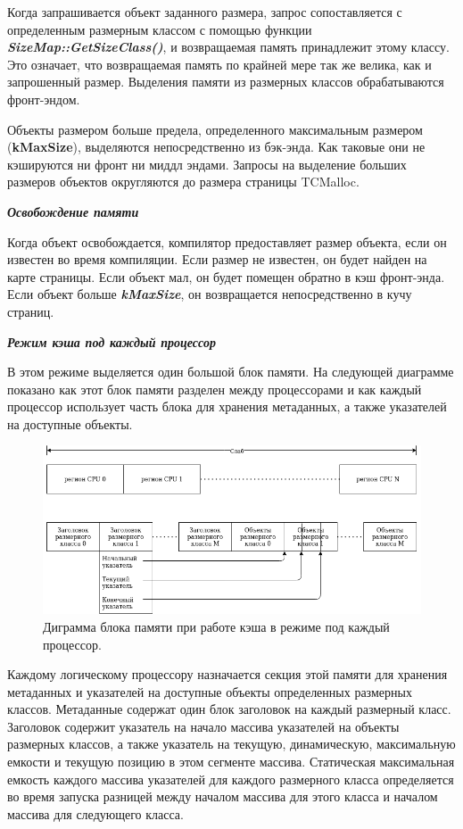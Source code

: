 Когда запрашивается объект заданного размера, запрос сопоставляется с определенным размерным классом с помощью функции \textit{\textbf{SizeMap::GetSizeClass()}}, и возвращаемая память принадлежит этому классу. Это означает, что возвращаемая память по крайней мере так же велика, как и запрошенный размер. Выделения памяти из размерных классов обрабатываются фронт-эндом.

Объекты размером больше предела, определенного максимальным размером (\textbf{kMaxSize}), выделяются непосредственно из бэк-энда. Как таковые они не кэшируются ни фронт ни миддл эндами. Запросы на выделение больших размеров объектов округляются до размера страницы TCMalloc.

\bigbreak
\textit{\textbf{Освобождение памяти}}

Когда объект освобождается, компилятор предоставляет размер объекта, если он известен во время компиляции. Если размер не известен, он будет найден на карте страницы. Если объект мал, он будет помещен обратно в кэш фронт-энда. Если объект больше \textbf{\textit{kMaxSize}}, он возвращается непосредственно в кучу страниц.

\bigbreak
\textit{\textbf{Режим кэша под каждый процессор}}

В этом режиме выделяется один большой блок памяти. На следующей диаграмме показано как этот блок памяти разделен между процессорами и как каждый процессор использует часть блока для хранения метаданных, а также указателей на доступные объекты.

\begin{figure}[!h]
	\begin{center}
		\includegraphics[scale=0.6]{images/tcmalloc-per-cpu.png}
		\caption{Диграмма блока памяти при работе кэша в режиме под каждый процессор.}
		\label{tcmalloc-per-cpu}
	\end{center}
\end{figure}

Каждому логическому процессору назначается секция этой памяти для хранения метаданных и указателей на доступные объекты определенных размерных классов. Метаданные содержат один блок заголовок на каждый размерный класс. Заголовок содержит указатель на начало массива указателей на объекты размерных классов, а также указатель на текущую, динамическую, максимальную емкости и текущую позицию в этом сегменте массива. Статическая максимальная емкость каждого массива указателей для каждого размерного класса определяется во время запуска разницей между началом массива для этого класса и началом массива для следующего класса.

